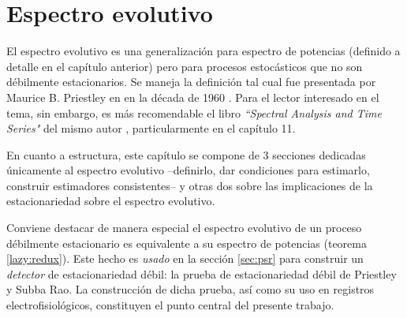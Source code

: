 \documentclass[12pt,letterpaper]{book}
\begin{document}
\chapter{Espectro evolutivo}
\label{capitulo:espectro_evo}

El espectro evolutivo es una generalización para espectro de potencias (definido a detalle en el capítulo anterior) pero para procesos estocásticos que no son débilmente estacionarios.
%
Se maneja la definición tal cual fue presentada por Maurice B. Priestley en en la década de 1960 \cite{Priestley65,Priestley66,Priestley69}.
%
Para el lector interesado en el tema, sin embargo, es más recomendable el libro \textit{``Spectral Analysis and Time Series"} del mismo autor \cite{Priestley81}, particularmente en el capítulo 11.

En cuanto a estructura, este capítulo se compone de 3 secciones dedicadas únicamente al espectro evolutivo --definirlo, dar condiciones para estimarlo, construir estimadores consistentes-- y otras dos sobre las implicaciones de la estacionariedad sobre el espectro evolutivo.

Conviene destacar de manera especial el espectro evolutivo de un proceso débilmente estacionario es equivalente a su espectro de potencias (teorema \ref{lazy:redux}). Este hecho es \textit{usado} en la sección \ref{sec:psr} para construir un \textit{detector} de estacionariedad débil: la prueba de estacionariedad débil de Priestley y Subba Rao.
%
La construcción de dicha prueba, así como su uso en registros electrofisiológicos, constituyen el punto central del presente trabajo.

%

\end{document}
